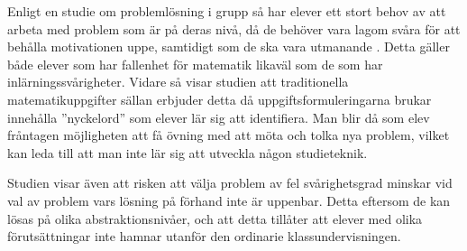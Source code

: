 \textcolor{Mahogany}{Enligt en studie om problemlösning i grupp så har elever ett stort behov av att arbeta med problem som är på deras nivå, då de behöver vara lagom svåra för att behålla motivationen uppe, samtidigt som de ska vara utmanande \cite{undervisningviaproblemlosning}. Detta gäller både elever som har fallenhet för matematik likaväl som de som har inlärningssvårigheter. Vidare så visar studien att traditionella matematikuppgifter sällan erbjuder detta då uppgiftsformuleringarna brukar innehålla ''nyckelord'' som elever lär sig att identifiera. Man blir då som elev fråntagen möjligheten att få övning med att möta och tolka nya problem, vilket kan leda till att man inte lär sig att utveckla någon studieteknik.}

\textcolor{Mahogany}{Studien visar även att risken att välja problem av fel svårighetsgrad minskar vid val av problem vars lösning på förhand inte är uppenbar. Detta eftersom de kan lösas på olika abstraktionsnivåer, och att detta tillåter att elever med olika förutsättningar inte hamnar utanför den ordinarie klassundervisningen.}

